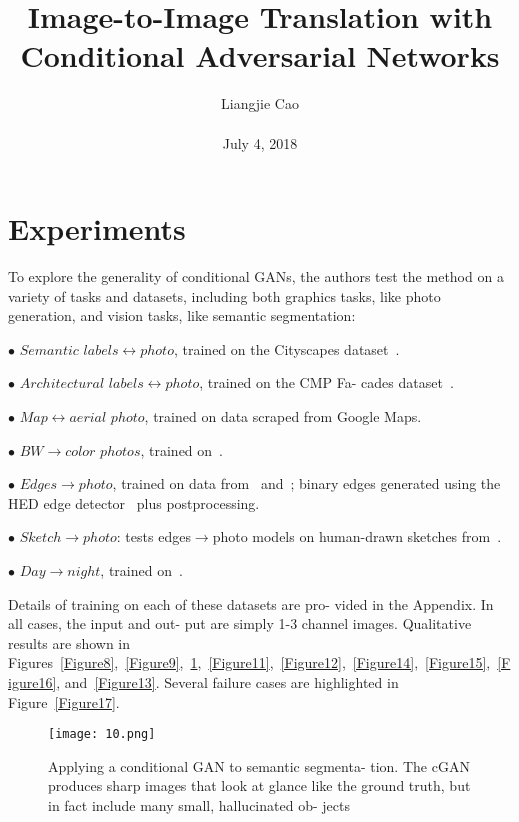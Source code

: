 \documentclass[10pt,twocolumn,letterpaper]{article}
\begin{document}
\title{\textbf{Image-to-Image Translation with Conditional Adversarial Networks
}}
\author{Liangjie Cao\\\\ July 4, 2018}
\maketitle
\section{Experiments}
To explore the generality of conditional GANs, the authors test
the method on a variety of tasks and datasets, including both
graphics tasks, like photo generation, and vision tasks, like
semantic segmentation:\par
$\bullet$ $Semantic$ $labels\leftrightarrow{photo}$, trained on the Cityscapes
dataset~\cite{name4}.
\par$\bullet$ $Architectural$ $labels\leftrightarrow{photo}$, trained on the CMP Fa-
cades dataset~\cite{name31}.
\par$\bullet$ $Map\leftrightarrow{aerial}$ $photo$, trained on data scraped from
Google Maps.
\par$\bullet$ $BW\to{color}$ $photos$, trained on~\cite{name35}.
\par$\bullet$ $Edges\to{photo}$, trained on data from~\cite{name49} and~\cite{name44}; binary edges generated using the HED edge detector~\cite{name42} plus postprocessing.
\par$\bullet$ $Sketch\to{photo}$: tests edges$\to$photo models on human-drawn sketches from~\cite{name10}.
\par$\bullet$ $Day\to{night}$, trained on~\cite{name21}.
\par Details of training on each of these datasets are pro-
vided in the Appendix. In all cases, the input and out-
put are simply 1-3 channel images. Qualitative results
are shown in Figures~\ref{Figure8},~\ref{Figure9},~\ref{Figure10},~\ref{Figure11},~\ref{Figure12},~\ref{Figure14},~\ref{Figure15},~\ref{Figure16}, and~\ref{Figure13}. Several failure cases are highlighted in Figure~\ref{Figure17}. 
   \begin{figure}[!htbp]
 \centering
 \texttt{[image: 10.png]}\\
 \caption{Applying a conditional GAN to semantic segmenta-
tion. The cGAN produces sharp images that look at glance like
the ground truth, but in fact include many small, hallucinated ob-
jects}\label{Figure10}
 \end{figure}
\end{document}
